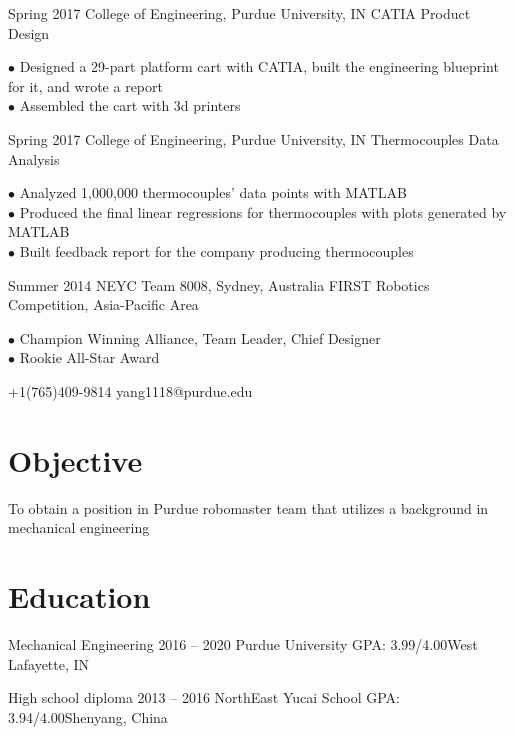 \documentclass{tccv}
\begin{document}
\begin{eventlist}

\item{Spring 2017}
     {College of Engineering, Purdue University, IN}
     {CATIA Product Design}
     
$\bullet$ Designed a 29-part platform cart with CATIA, built the engineering blueprint for it, and wrote a report\\
$\bullet$ Assembled the cart with 3d printers

\item{Spring 2017}
     {College of Engineering, Purdue University, IN}
     {Thermocouples Data Analysis}

$\bullet$ Analyzed 1,000,000 thermocouples’ data points with MATLAB\\
$\bullet$ Produced the final linear regressions for thermocouples with plots generated by MATLAB\\
$\bullet$ Built feedback report for the company producing thermocouples

\item{Summer 2014}
     {NEYC Team 8008, Sydney, Australia}
     {FIRST Robotics Competition, Asia-Pacific Area}
     
$\bullet$ Champion Winning Alliance, Team Leader, Chief Designer\\
$\bullet$ Rookie All-Star Award


\end{eventlist}

    {+1(765)409-9814}
    {yang1118@purdue.edu}
    
\section{Objective}

To obtain a position in Purdue robomaster team that utilizes a background in mechanical engineering

\section{Education}

\begin{yearlist}

\item[Mechanical Engineering]{2016 -- 2020}
     {Purdue University}
     {GPA: 3.99/4.00\newline West Lafayette, IN}
     
\item[High school diploma]{2013 -- 2016}
     {NorthEast Yucai School}
     {GPA: 3.94/4.00\newline Shenyang, China}

\end{yearlist}
\end{document}
